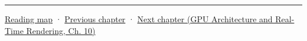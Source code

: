 \begin{center}\rule{0.5\linewidth}{0.5pt}\end{center}

\hyperref[volume-reading-map]{Reading map} · \hyperref[05-engine-i-ch017-ecs-performance-through-cache-and-scheduling]{Previous chapter} · \href{../06-GPU-Architecture-and-Real-Time-Rendering/main.pdf\#nameddest=05-engine-i-ch019-gpu-work-and-reusable-metal-frames}{Next chapter (GPU Architecture and Real-Time Rendering, Ch. 10)}
